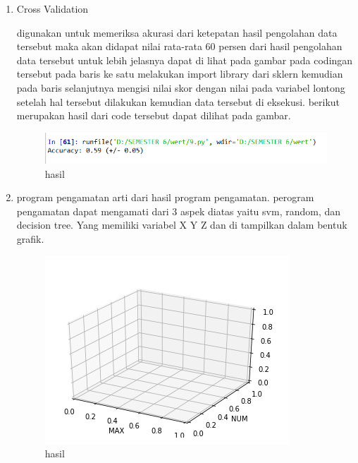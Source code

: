 \begin{enumerate}
\item Cross Validation\par
 digunakan untuk memeriksa akurasi dari ketepatan hasil pengolahan data tersebut maka akan didapat nilai rata-rata 60 persen dari hasil pengolahan data tersebut untuk lebih jelasnya dapat di lihat pada gambar pada codingan tersebut pada baris ke satu melakukan import library dari sklern kemudian pada baris selanjutnya mengisi nilai skor dengan nilai pada variabel lontong setelah hal tersebut dilakukan kemudian data tersebut di eksekusi. berikut merupakan hasil dari code tersebut dapat dilihat pada gambar.

\begin{figure}[ht]
\centering
\includegraphics[scale=0.5]{figures/1174012/3/10.PNG}
\caption{hasil}
\label{contoh}
\end{figure}

\item program pengamatan
arti dari hasil program pengamatan. perogram pengamatan dapat mengamati dari 3 aspek diatas yaitu svm, random, dan decision tree. Yang memiliki variabel X Y Z dan di tampilkan dalam bentuk grafik. 

\begin{figure}[ht]
\centering
\includegraphics[scale=0.5]{figures/1174012/3/11.PNG}
\caption{hasil}
\label{contoh}
\end{figure}
\end{enumerate}


